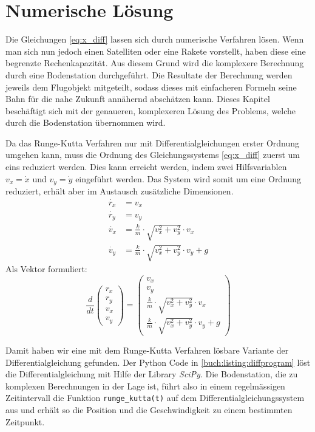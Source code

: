 \section{Numerische Lösung
\label{perturbation:section:nummerischeloesung}}
Die Gleichungen \eqref{eq:x_diff} lassen sich durch numerische Verfahren lösen. 
Wenn man sich nun jedoch einen Satelliten oder eine Rakete vorstellt, haben diese eine begrenzte Rechenkapazität. 
Aus diesem Grund wird die komplexere Berechnung durch eine Bodenstation durchgeführt. 
Die Resultate der Berechnung werden jeweils dem Flugobjekt mitgeteilt, sodass dieses mit einfacheren Formeln seine Bahn für die nahe Zukunft annähernd abschätzen kann. 
Dieses Kapitel beschäftigt sich mit der genaueren, komplexeren Lösung des Problems, welche durch die Bodenstation übernommen wird.

Da das Runge-Kutta Verfahren nur mit Differentialgleichungen erster Ordnung umgehen kann, muss die Ordnung des Gleichungssystems \eqref{eq:x_diff}  zuerst um eins reduziert werden. 
Dies kann erreicht werden, indem zwei Hilfsvariablen $v_x = \dot{x}$ und $v_y = \dot{y}$ eingeführt werden. 
Das System wird somit um eine Ordnung reduziert, erhält aber im Austausch zusätzliche Dimensionen.
\begin{equation*}
\begin{aligned}
	\dot{r_x} &= v_x  \\
	\dot{r_y} &= v_y \\
	\dot{v_x} &= \frac{k}{m} \cdot \sqrt{v_x^2 + v_y^2} \cdot v_x \\
	\dot{v_y} &= \frac{k}{m} \cdot \sqrt{v_x^2 + v_y^2} \cdot v_y + g
\end{aligned}
\end{equation*}
Als Vektor formuliert:
\[
\frac{d}{dt}\begin{pmatrix}r_x\\r_y\\v_x\\v_y\end{pmatrix} = \begin{pmatrix}v_x\\v_y\\\frac{k}{m} \cdot \sqrt{v_x^2 + v_y^2} \cdot v_x\\\frac{k}{m} \cdot \sqrt{v_x^2 + v_y^2} \cdot v_y + g\end{pmatrix}
\]

Damit haben wir eine mit dem  Runge-Kutta Verfahren lösbare Variante der Differentialgleichung gefunden. 
Der Python Code in \ref{buch:listing:diffprogram} löst die Differentialgleichung mit Hilfe der Library \textit{SciPy}.
Die Bodenstation, die zu komplexen Berechnungen in der Lage ist, führt also in einem regelmässigen Zeitintervall die Funktion \lstinline[language=Python]{runge_kutta(t)} auf dem Differentialgleichungssystem aus und erhält so die Position und die Geschwindigkeit zu einem bestimmten Zeitpunkt.




